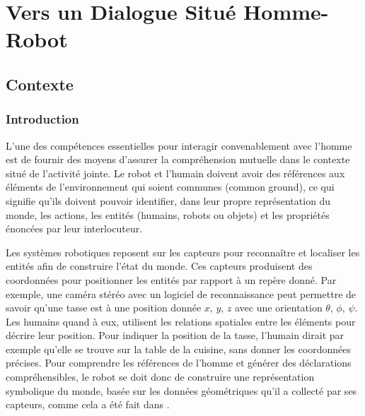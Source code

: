 \documentclass[a4paper,11pt,twoside]{StyleThese}
\begin{document}
\setcounter{chapter}{3} %
\dominitoc
\faketableofcontents
\fi

\chapter{Vers un Dialogue Situé Homme-Robot}
\label{chapter3}
\minitoc

\section{Contexte}

\subsection{Introduction}
L'une des compétences essentielles pour interagir convenablement avec l'homme est de fournir des moyens d'assurer la compréhension mutuelle dans le contexte situé de l'activité jointe. Le robot et l'humain doivent avoir des références aux éléments de l'environnement qui soient communes (common ground), ce qui signifie qu'ils doivent pouvoir identifier, dans leur propre représentation du monde, les actions, les entités (humains, robots ou objets) et les propriétés énoncées par leur interlocuteur.

Les systèmes robotiques reposent sur les capteurs pour reconnaître et localiser les entités afin de construire l'état du monde. Ces capteurs produisent des coordonnées pour positionner les entités par rapport à un repère donné. Par exemple, une caméra stéréo avec un logiciel de reconnaissance peut permettre de savoir qu'une tasse est à une position donnée  $x$, $y$, $z$ avec une orientation $\theta$, $\phi$, $\psi$.
Les humains quand à eux, utilisent les relations spatiales entre les éléments pour décrire leur position. Pour indiquer la position de la tasse, l'humain dirait par exemple qu'elle se trouve sur la table de la cuisine, sans donner les coordonnées précises.
Pour comprendre les références de l'homme et générer des déclarations compréhensibles, le robot se doit donc de construire une représentation symbolique du monde, basée sur les données géométriques qu'il a collecté par ses capteurs, comme cela a été fait dans \cite{lemaignan2012grounding}.

\end{document}
